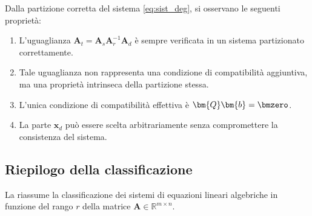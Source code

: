 \begin{oss}
	Dalla partizione corretta del sistema \eqref{eq:sist_deg}, si osservano le seguenti proprietà:
	\begin{enumerate}
		\item L'uguaglianza $\bm{A}_t = \bm{A}_s \bm{A}_r^{-1} \bm{A}_d$ è sempre verificata in un sistema partizionato correttamente.
		\item Tale uguaglianza non rappresenta una condizione di compatibilità aggiuntiva, ma una proprietà intrinseca della partizione stessa.
		\item L'unica condizione di compatibilità effettiva è $\bm{Q} \bm{b} = \bmzero$.
		\item La parte $\bm{x}_d$ può essere scelta arbitrariamente senza compromettere la consistenza del sistema.
	\end{enumerate}
\end{oss}


\subsection{Riepilogo della classificazione}

La  riassume la	classificazione dei sistemi di equazioni lineari algebriche	in funzione del rango $r$ della matrice	$\bm{A} \in \mathbb{R}^{m \times n}$.



\begin{table}[ht]
	\centering
	\small
	\renewcommand{\arraystretch}{1.4}
	\caption{Classificazione dei sistemi lineari $\bm{A}\bm{x}=\bm{b}$.}
	\label{tab:classificazione_sistlin}
\end{table}



